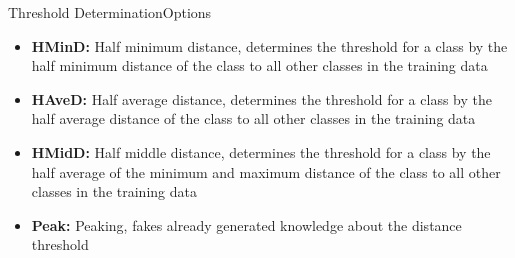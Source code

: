 \begin{frame}{Threshold Determination}{Options}
    \begin{itemize}
        \item \textbf{HMinD:} Half minimum distance, determines the threshold for a class by the
            half minimum distance of the class to all other classes in the training data
        
        \item \textbf{HAveD:} Half average distance, determines the threshold for a class by the
            half average distance of the class to all other classes in the training data
        
        \item \textbf{HMidD:} Half middle distance, determines the threshold for a class by the
            half average of the minimum and maximum distance of the class to all other classes in the training data
        
        \item \textbf{Peak:} Peaking, fakes already generated knowledge about the distance
            threshold
    \end{itemize}
\end{frame}
